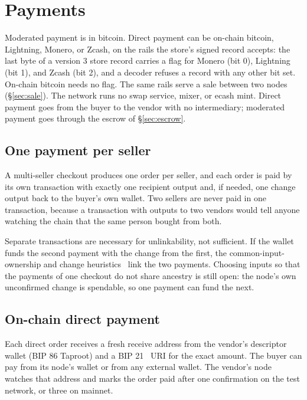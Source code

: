 \section{Payments}
\label{sec:payments}

Moderated payment is in bitcoin. Direct payment can be on-chain bitcoin, Lightning, Monero, or Zcash, on the rails the store's signed record accepts: the last byte of a version 3 store record carries a flag for Monero (bit 0), Lightning (bit 1), and Zcash (bit 2), and a decoder refuses a record with any other bit set. On-chain bitcoin needs no flag. The same rails serve a sale between two nodes (\S\ref{sec:sale}). The network runs no swap service, mixer, or ecash mint. Direct payment goes from the buyer to the vendor with no intermediary; moderated payment goes through the escrow of \S\ref{sec:escrow}.

\subsection{One payment per seller}

A multi-seller checkout produces one order per seller, and each order is paid by its own transaction with exactly one recipient output and, if needed, one change output back to the buyer's own wallet. Two sellers are never paid in one transaction, because a transaction with outputs to two vendors would tell anyone watching the chain that the same person bought from both.

Separate transactions are necessary for unlinkability, not sufficient. If the wallet funds the second payment with the change from the first, the common-input-ownership and change heuristics~\citep{meiklejohn2013fistful} link the two payments. Choosing inputs so that the payments of one checkout do not share ancestry is still open: the node's own unconfirmed change is spendable, so one payment can fund the next.

\subsection{On-chain direct payment}

Each direct order receives a fresh receive address from the vendor's descriptor wallet (BIP 86 Taproot) and a BIP 21~\citep{bip21} URI for the exact amount. The buyer can pay from its node's wallet or from any external wallet. The vendor's node watches that address and marks the order paid after one confirmation on the test network, or three on mainnet.

